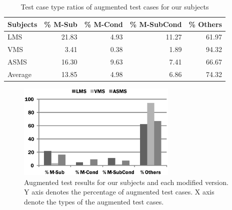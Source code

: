 \begin{table}[htbp]
  \centering
  \caption{Test case type ratios of augmented test cases for our subjects}
    \begin{tabular}{|l|r|r|r|r|}
		\hline
    Subjects & \% M-Sub & \% M-Cond & \% M-SubCond  & \% Others \\\hline\hline
    LMS   & 21.83 & 4.93  & 11.27 & 61.97 \\\hline
    VMS   & 3.41  & 0.38  & 1.89  & 94.32 \\\hline
    ASMS  & 16.30 & 9.63  & 7.41  & 66.67 \\\hline\hline
    Average & 13.85 & 4.98  & 6.86  & 74.32 \\\hline
    \end{tabular}%
  \label{tab:augment-results}%
\end{table}%
 \vspace{-20pt}
\begin{figure}[htbp]
    \centering
        \includegraphics[width=3.0in]{augmenttypes.eps}
        \vspace{-5pt}
    \caption{\label{fig:augment-results} Augmented test results for our subjects and each modified version. Y axis
    denotes the percentage of augmented test cases. X axis denote the types of the augmented test cases.}
    \vspace{-10pt}
\end{figure}


